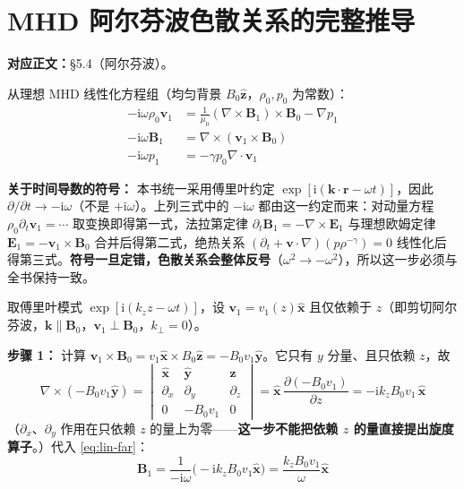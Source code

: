 \documentclass[12pt,a4paper,openany,oneside]{book}
\newcommand{\ii}{\mathrm{i}}
\newcommand{\vect}[1]{\bm{#1}}
\newcommand{\unitvec}[1]{\hat{\vect{#1}}}
\newcommand{\grad}{\nabla}
\newcommand{\curl}{\nabla\times}
\newcommand{\divg}{\nabla\cdot}
\begin{document}
\section{MHD 阿尔芬波色散关系的完整推导}
\label{sec:alfven-dispersion}

\textbf{对应正文：}\S 5.4（阿尔芬波）。

从理想 MHD 线性化方程组（均匀背景 $B_0\unitvec{z}$，$\rho_0, p_0$ 为常数）：
\begin{align}
-\ii\omega\rho_0\vect{v}_1 &= \frac{1}{\mu_0}(\curl\vect{B}_1)\times\vect{B}_0 - \grad p_1 \label{eq:lin-mom}\\
-\ii\omega\vect{B}_1 &= \curl(\vect{v}_1\times\vect{B}_0) \label{eq:lin-far}\\
-\ii\omega p_1 &= -\gamma p_0\divg\vect{v}_1 \label{eq:lin-eos}
\end{align}

\textbf{关于时间导数的符号：} 本书统一采用傅里叶约定 $\exp[\ii(\vect{k}\cdot\vect{r}-\omega t)]$，因此 $\partial/\partial t\to-\ii\omega$（不是 $+\ii\omega$）。上列三式中的 $-\ii\omega$ 都由这一约定而来：对动量方程 $\rho_0\partial_t\vect{v}_1=\cdots$ 取变换即得第一式，法拉第定律 $\partial_t\vect{B}_1=-\curl\vect{E}_1$ 与理想欧姆定律 $\vect{E}_1=-\vect{v}_1\times\vect{B}_0$ 合并后得第二式，绝热关系 $(\partial_t+\vect{v}\cdot\grad)(p\rho^{-\gamma})=0$ 线性化后得第三式。\textbf{符号一旦定错，色散关系会整体反号}（$\omega^2\to-\omega^2$），所以这一步必须与全书保持一致。

取傅里叶模式 $\exp[\ii(k_z z - \omega t)]$，设 $\vect{v}_1 = v_1(z)\unitvec{x}$ 且仅依赖于 $z$（即剪切阿尔芬波，$\vect{k}\parallel\vect{B}_0$，$\vect{v}_1\perp\vect{B}_0$，$k_\perp=0$）。

\textbf{步骤 1：} 计算 $\vect{v}_1\times\vect{B}_0 = v_1\unitvec{x}\times B_0\unitvec{z} = -B_0v_1\unitvec{y}$。它只有 $y$ 分量、且只依赖 $z$，故
\[
\curl(-B_0v_1\unitvec{y}) = \begin{vmatrix}\unitvec{x}&\unitvec{y}&\unitvec{z}\\ \partial_x&\partial_y&\partial_z\\ 0&-B_0v_1&0\end{vmatrix}
= \unitvec{x}\,\frac{\partial(-B_0v_1)}{\partial z} = -\ii k_z B_0v_1\,\unitvec{x}
\]
（$\partial_x$、$\partial_y$ 作用在只依赖 $z$ 的量上为零——\textbf{这一步不能把依赖 $z$ 的量直接提出旋度算子}。）代入 \eqref{eq:lin-far}：
\begin{equation}
\vect{B}_1 = \frac{1}{-\ii\omega}\bigl(-\ii k_z B_0v_1\unitvec{x}\bigr) = \frac{k_z B_0 v_1}{\omega}\unitvec{x}
\label{eq:ch9-alfven-b1}
\end{equation}
\end{document}

